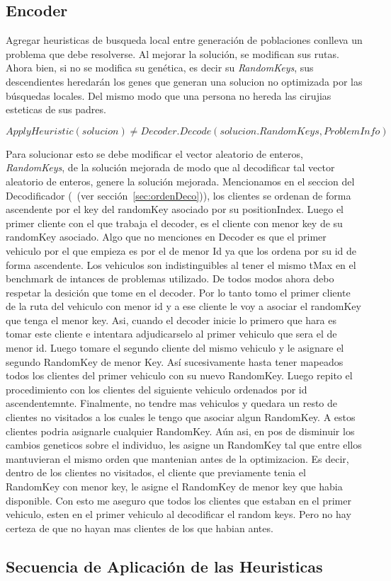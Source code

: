 \subsection{Encoder}

Agregar heuristicas de busqueda local entre generación de poblaciones conlleva un problema que debe resolverse. Al mejorar la solución, se modifican sus rutas. Ahora bien, si no se modifica su genética, es decir su \textit{RandomKeys}, sus descendientes heredarán los genes que generan una solucion no optimizada por las búsquedas locales. Del mismo modo que una persona no hereda las cirujias esteticas de sus padres. 

\begin{equation*}
ApplyHeuristic(solucion) \neq Decoder.Decode(solucion.RandomKeys, ProblemInfo)
\end{equation*}

Para solucionar esto se debe modificar el vector aleatorio de enteros, \textit{RandomKeys}, de la solución mejorada de modo que al decodificar tal vector aleatorio de enteros, genere la solución mejorada. Mencionamos en el seccion del Decodificador (~(ver sección~\ref{sec:ordenDeco})), los clientes se ordenan de forma ascendente por el key del randomKey asociado por su positionIndex. Luego el primer cliente con el que trabaja el decoder, es el cliente con menor key de su randomKey asociado. Algo que no menciones en Decoder es que el primer vehiculo por el que empieza es por el de menor Id ya que los ordena por su id de forma ascendente. Los vehiculos son indistinguibles al tener el mismo tMax en el benchmark de intances de problemas utilizado. De todos modos ahora debo respetar la desición que tome en el decoder. Por lo tanto tomo el primer cliente de la ruta del vehiculo con menor id y a ese cliente le voy a asociar el randomKey que tenga el menor key. Asi, cuando el decoder inicie lo primero que hara es tomar este cliente e intentara adjudicarselo al primer vehiculo que sera el de menor id. Luego tomare el segundo cliente del mismo vehiculo y le asignare el segundo RandomKey de menor Key. Así sucesivamente hasta tener mapeados todos los clientes del primer vehiculo con su nuevo RandomKey. Luego repito el procedimiento con los clientes del siguiente vehiculo ordenados por id ascendentemnte. Finalmente, no tendre mas vehiculos y quedara un resto de clientes no visitados a los cuales le tengo que asociar algun RandomKey. A estos clientes podria asignarle cualquier RandomKey. Aún asi, en pos de disminuir los cambios geneticos sobre el individuo, les asigne un RandomKey tal que entre ellos mantuvieran el mismo orden que mantenian antes de la optimizacion. Es decir, dentro de los clientes no visitados, el cliente que previamente tenia el RandomKey con menor key, le asigne el RandomKey de menor key que habia disponible. Con esto me aseguro que todos los clientes que estaban en el primer vehiculo, esten en el primer vehiculo al decodificar el random keys. Pero no hay certeza de que no hayan mas clientes de los que habian antes.


\subsection{Secuencia de Aplicación de las Heuristicas}